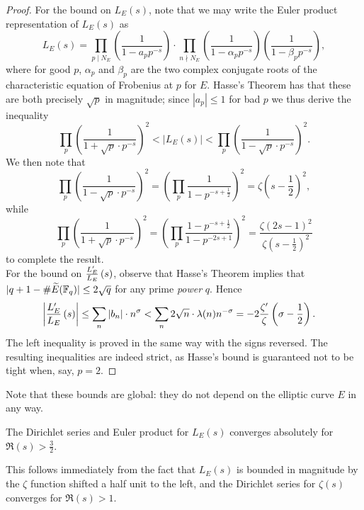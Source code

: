 \begin{proof}
For the bound on $L_E(s)$, note that we may write the Euler product representation of $L_E(s)$ as
\begin{equation}
L_E(s) = \prod_{p \mid N_E} \left(\frac{1}{1-a_p p^{-s}}\right) \cdot \prod_{n \nmid N_E} \left(\frac{1}{1-\alpha_p p^{-s}}\right)\left(\frac{1}{1-\beta_p p^{-s}}\right),
\end{equation}
where for good $p$, $\alpha_p$ and $\beta_p$ are the two complex conjugate roots of the characteristic equation of Frobenius at $p$ for $E$. Hasse's Theorem has that these are both precisely $\sqrt{p}$ in magnitude; since $|a_p|\le 1$ for bad $p$ we thus derive the inequality
\begin{equation}
\prod_p \left(\frac{1}{1+ \sqrt{p}\cdot p^{-s}}\right)^2 < \left|L_E(s)\right| < \prod_p \left(\frac{1}{1- \sqrt{p}\cdot p^{-s}}\right)^2.
\end{equation}
We then note that 
\[ \prod_p \left(\frac{1}{1- \sqrt{p}\cdot p^{-s}}\right)^2 = \left(\prod_p \frac{1}{1- p^{-s+\frac{1}{2}}}\right)^2 = \zeta(s-\frac{1}{2})^2,\] 
while
\[ \prod_p \left(\frac{1}{1+ \sqrt{p}\cdot p^{-s}}\right)^2 = \left(\prod_p \frac{1- p^{-s+\frac{1}{2}}}{1- p^{-2s+1}}\right)^2 = \frac{\zeta(2s-1)^2}{\zeta(s-\frac{1}{2})^2}\]
to complete the result. \\ 

For the bound on $\frac{L_E^{\prime}}{L_E}\left(s\right)$, observe that Hasse's Theorem implies that $|q + 1 - \#\widetilde{E}(\mathbb{F}_{q})| \le 2\sqrt{q}$ for any prime {\it power} $q$. Hence
\begin{align*}
\left| \frac{L_E^{\prime}}{L_E}\left(s\right)\right| &\le \sum_n |b_n| \cdot n^\sigma < \sum_{n} 2\sqrt{n} \cdot \lambda(n) n^{-\sigma}  = -2\frac{\zeta^{\prime}}{\zeta}\left(\sigma-\frac{1}{2}\right).
\end{align*}
The left inequality is proved in the same way with the signs reversed. The resulting inequalities are indeed strict, as Hasse's bound is guaranteed not to be tight when, say, $p=2$.
\end{proof}
Note that these bounds are global: they do not depend on the elliptic curve $E$ in any way.

\begin{corollary}\label{cor:L_E_abs_convergence}
The Dirichlet series and Euler product for $L_E(s)$ converges absolutely for $\Re(s)>\frac{3}{2}$.
\end{corollary}
This follows immediately from the fact that $L_E(s)$ is bounded in magnitude by the $\zeta$ function shifted a half unit to the left, and the Dirichlet series for $\zeta(s)$ converges for $\Re(s)>1$.

